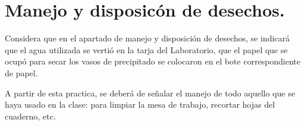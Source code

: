 \documentclass[14pt]{extarticle}
\begin{document}
\section{Manejo y disposicón de desechos.}

Considera que en el apartado de manejo y disposición de desechos, se indicará que el agua utilizada se vertió en la tarja del Laboratorio, que el papel que se ocupó para secar los vasos de precipitado se colocaron en el bote correspondiente de papel.

A partir de esta practica, se deberá de señalar el manejo de todo aquello que se haya usado en la clase: para limpiar la mesa de trabajo, recortar hojas del cuaderno, etc.
\end{document}
